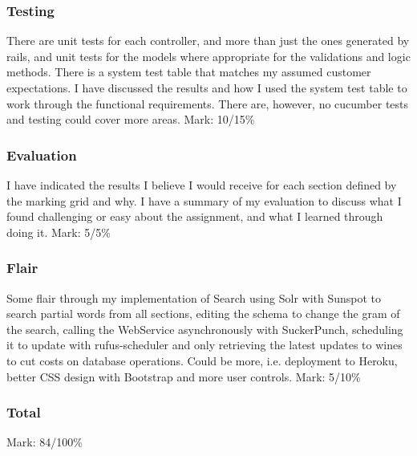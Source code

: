 \documentclass[12pt]{article}
\begin{document}
\subsubsection{Testing}
There are unit tests for each controller, and more than just the ones generated by rails, and unit tests for the models where appropriate for the validations and logic methods. There is a system test table that matches my assumed customer expectations. I have discussed the results and how I used the system test table to work through the functional requirements. There are, however, no cucumber tests and testing could cover more areas.
\newline
Mark: 10/15\%

\subsubsection{Evaluation}
I have indicated the results I believe I would receive for each section defined by the marking grid and why. I have a summary of my evaluation to discuss what I found challenging or easy about the assignment, and what I learned through doing it.
\newline
Mark: 5/5\%

\subsubsection{Flair}
Some flair through my implementation of Search using Solr with Sunspot to search partial words from all sections, editing the schema to change the gram of the search, calling the WebService asynchronously with SuckerPunch, scheduling it to update with rufus-scheduler and only retrieving the latest updates to wines to cut costs on database operations. Could be more, i.e. deployment to Heroku, better CSS design with Bootstrap and more user controls.
\newline
Mark: 5/10\%

\subsubsection{Total}
Mark: 84/100\%



\clearpage

\end{document}
